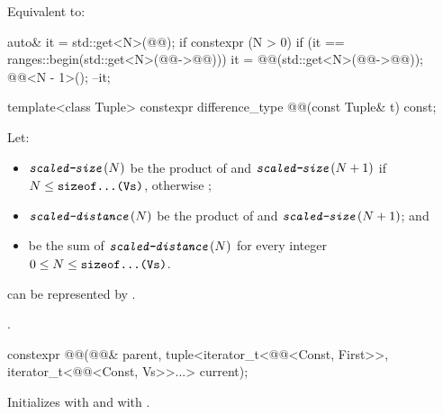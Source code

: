 \begin{itemdescr}
\pnum
\effects
Equivalent to:
\begin{codeblock}
auto& it = std::get<N>(@@);
if constexpr (N > 0) {
  if (it == ranges::begin(std::get<N>(@@->@@))) {
    it = @@(std::get<N>(@@->@@));
    @@<N - 1>();
  }
}
--it;
\end{codeblock}
\end{itemdescr}

%
\begin{itemdecl}
template<class Tuple>
  constexpr difference_type @@(const Tuple& t) const;
\end{itemdecl}

\begin{itemdescr}
\pnum
Let:
\begin{itemize}
\item
$\exposid{scaled-size}(N)$ be the product of
 and
$\exposid{scaled-size}(N+1)$
if $N \le \tcode{sizeof...(Vs)}$, otherwise ;
\item
$\exposid{scaled-distance}(N)$ be the product of
 and $\exposid{scaled-size}(N+1)$; and
\item
{} be the sum of $\exposid{scaled-distance}(N)$
for every integer $0 \le N \le \tcode{sizeof...(Vs)}$.
\end{itemize}

\pnum
\expects
{} can be represented by .

\pnum
\returns
{}.
\end{itemdescr}

%
\begin{itemdecl}
constexpr @@(@@& parent, tuple<iterator_t<@@<Const, First>>,
  iterator_t<@@<Const, Vs>>...> current);
\end{itemdecl}

\begin{itemdescr}
\pnum
\effects
Initializes
 with  and
 with .
\end{itemdescr}

